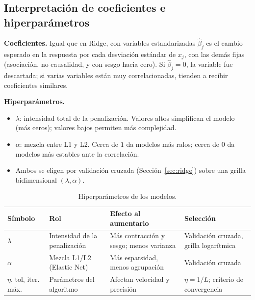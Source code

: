 \documentclass[11pt,a4paper]{article}
\theoremstyle{simple}
\begin{document}
\subsection{Interpretación de coeficientes e hiperparámetros}
\textbf{Coeficientes.} Igual que en Ridge, con variables estandarizadas $\hat\beta_j$ es el cambio esperado en la respuesta por cada desviación estándar de $x_j$, con las demás fijas (asociación, no causalidad, y con sesgo hacia cero). Si $\hat\beta_j=0$, la variable fue descartada; si varias variables están muy correlacionadas, tienden a recibir coeficientes similares.

\textbf{Hiperparámetros.}
\begin{itemize}
\item $\lambda$: intensidad total de la penalización. Valores altos simplifican el modelo (más ceros); valores bajos permiten más complejidad.
\item $\alpha$: mezcla entre L1 y L2. Cerca de $1$ da modelos más ralos; cerca de $0$ da modelos más estables ante la correlación.
\item Ambos se eligen por validación cruzada (Sección~\ref{sec:ridge}) sobre una grilla bidimensional $(\lambda,\alpha)$.
\end{itemize}

\begin{table}[H]
\centering
\caption{Hiperparámetros de los modelos.}\label{tab:hiper}
\small
\begin{tabular}{@{}L{2.6cm}L{3.1cm}L{3.9cm}L{3.2cm}@{}}
\toprule
\textbf{Símbolo} & \textbf{Rol} & \textbf{Efecto al aumentarlo} & \textbf{Selección}\\
\midrule
$\lambda$ & Intensidad de la penalización & Más contracción y sesgo; menos varianza & Validación cruzada, grilla logarítmica\\
$\alpha$ & Mezcla L1/L2 (Elastic Net) & Más esparsidad, menos agrupación & Validación cruzada\\
$\eta$, tol, iter. máx. & Parámetros del algoritmo & Afectan velocidad y precisión & $\eta=1/L$; criterio de convergencia\\
\bottomrule
\end{tabular}
\end{table}
\end{document}
